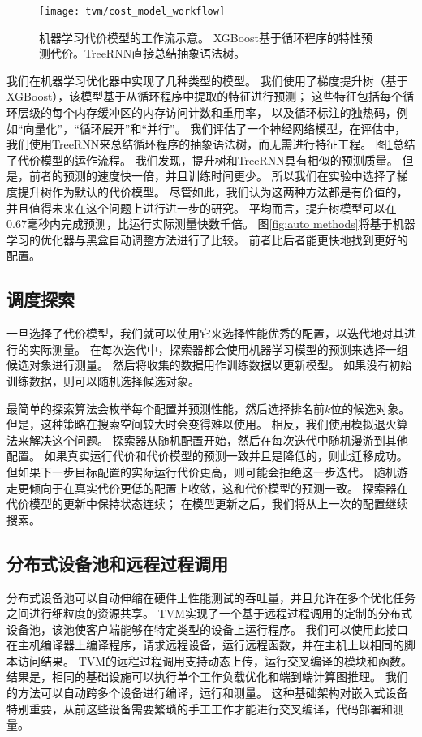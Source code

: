 \begin{figure}[htbp]
    \centering
    \texttt{[image: tvm/cost\_model\_workflow]}
    \caption{\label{fig:cost model workflow}机器学习代价模型的工作流示意。
    XGBoost基于循环程序的特性预测代价。TreeRNN直接总结抽象语法树。}
\end{figure}

我们在机器学习优化器中实现了几种类型的模型。
我们使用了梯度提升树（基于XGBoost），该模型基于从循环程序中提取的特征进行预测；
这些特征包括每个循环层级的每个内存缓冲区的内存访问计数和重用率，
以及循环标注的独热码，例如``向量化''，``循环展开''和``并行''。
我们评估了一个神经网络模型，在评估中，我们使用TreeRNN来总结循环程序的抽象语法树，而无需进行特征工程。
图\ref{fig:cost model workflow}总结了代价模型的运作流程。
我们发现，提升树和TreeRNN具有相似的预测质量。
但是，前者的预测的速度快一倍，并且训练时间更少。
所以我们在实验中选择了梯度提升树作为默认的代价模型。
尽管如此，我们认为这两种方法都是有价值的，并且值得未来在这个问题上进行进一步的研究。
平均而言，提升树模型可以在0.67毫秒内完成预测，比运行实际测量快数千倍。
图\ref{fig:auto methods}将基于机器学习的优化器与黑盒自动调整方法进行了比较。
前者比后者能更快地找到更好的配置。

\subsection{调度探索}
一旦选择了代价模型，我们就可以使用它来选择性能优秀的配置，以迭代地对其进行的实际测量。
在每次迭代中，探索器都会使用机器学习模型的预测来选择一组候选对象进行测量。
然后将收集的数据用作训练数据以更新模型。
如果没有初始训练数据，则可以随机选择候选对象。

最简单的探索算法会枚举每个配置并预测性能，然后选择排名前$k$位的候选对象。
但是，这种策略在搜索空间较大时会变得难以使用。
相反，我们使用模拟退火算法来解决这个问题。
探索器从随机配置开始，然后在每次迭代中随机漫游到其他配置。
如果真实运行代价和代价模型的预测一致并且是降低的，则此迁移成功。
但如果下一步目标配置的实际运行代价更高，则可能会拒绝这一步迭代。
随机游走更倾向于在真实代价更低的配置上收敛，这和代价模型的预测一致。
探索器在代价模型的更新中保持状态连续；
在模型更新之后，我们将从上一次的配置继续搜索。

\subsection{分布式设备池和远程过程调用}
分布式设备池可以自动伸缩在硬件上性能测试的吞吐量，并且允许在多个优化任务之间进行细粒度的资源共享。
TVM实现了一个基于远程过程调用的定制的分布式设备池，该池使客户端能够在特定类型的设备上运行程序。 
我们可以使用此接口在主机编译器上编译程序，请求远程设备，运行远程函数，并在主机上以相同的脚本访问结果。 
TVM的远程过程调用支持动态上传，运行交叉编译的模块和函数。 
结果是，相同的基础设施可以执行单个工作负载优化和端到端计算图推理。 
我们的方法可以自动跨多个设备进行编译，运行和测量。
这种基础架构对嵌入式设备特别重要，从前这些设备需要繁琐的手工工作才能进行交叉编译，代码部署和测量。